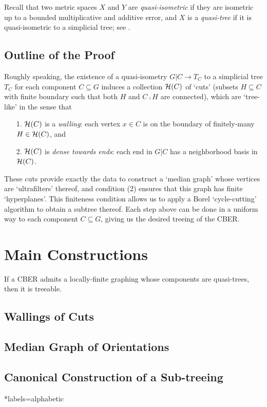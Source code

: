 \documentclass{amsart}
\begin{document}
    Recall that two metric spaces $X$ and $Y$ are \textit{quasi-isometric} if they are isometric up to a bounded multiplicative and additive error, and $X$ is a \textit{quasi-tree} if it is quasi-isometric to a simplicial tree; see \cite{DK18}.

    \subsection{Outline of the Proof}

    Roughly speaking, the existence of a quasi-isometry $G|C\to T_C$ to a simplicial tree $T_C$ for each component $C\subseteq G$ induces a collection $\mathcal{H}(C)$ of `cuts' (subsets $H\subseteq C$ with finite boundary such that both $H$ and $C\comp H$ are connected), which are `tree-like' in the sense that
    \begin{enumerate}
        \item[1.] $\mathcal{H}(C)$ is a \textit{walling}: each vertex $x\in C$ is on the boundary of finitely-many $H\in\mathcal{H}(C)$, and
        \item[2.] $\mathcal{H}(C)$ is \textit{dense towards ends}: each end in $G|C$ has a neighborhood basis in $\mathcal{H}(C)$.
    \end{enumerate}
    These cuts provide exactly the data to construct a `median graph' whose vertices are `ultrafilters' thereof, and condition (2) ensures that this graph has finite `hyperplanes'. This finiteness condition allows us to apply a Borel `cycle-cutting' algorithm to obtain a subtree thereof. Each step above can be done in a uniform way to each component $C\subseteq G$, giving us the desired treeing of the CBER.

    

    \section{Main Constructions}

    \begin{corollary}\label{cor:quasi-treeing_implies_treeing}
        If a CBER admits a locally-finite graphing whose components are quasi-trees, then it is treeable.
    \end{corollary}

    \subsection{Wallings of Cuts}

    \subsection{Median Graph of Orientations}

    \subsection{Canonical Construction of a Sub-treeing}

    \begin{bibdiv}
        \begin{biblist}*{labels={alphabetic}}
        \end{biblist}
    \end{bibdiv}
\end{document}
